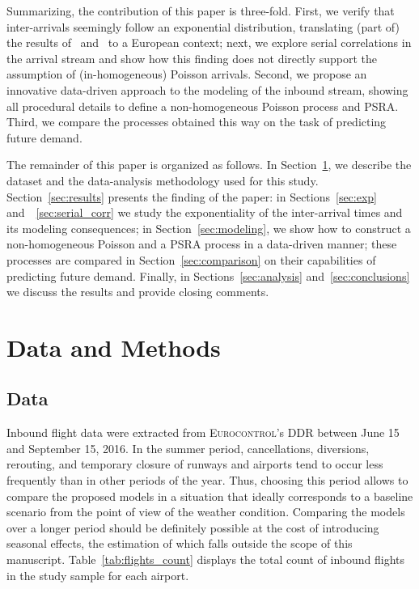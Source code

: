 \documentclass[draft,review]{elsarticle}
\begin{document}
Summarizing, the contribution of this paper is three-fold.
First, we verify that inter-arrivals seemingly follow an exponential distribution, translating (part of) the results of~\cite{willemain2004statistical} and~\citep{gwiggner2014data} to a European context; next, we explore serial correlations in the arrival stream and show how this finding does not directly support the assumption of (in-homogeneous) Poisson arrivals. Second, we propose an innovative data-driven approach to the modeling of the inbound stream, showing all procedural details to define a non-homogeneous Poisson process and \ac{PSRA}. Third, we compare the processes obtained this way on the task of predicting future demand.

The remainder of this paper is organized as follows.
In Section~\ref{sec:data_methods}, we describe the dataset and the data-analysis methodology used for this study.
Section~\ref{sec:results} presents the finding of the paper:
in Sections~\ref{sec:exp} and~~\ref{sec:serial_corr} we study the exponentiality of the inter-arrival times and its modeling consequences; in Section~\ref{sec:modeling}, we show how to construct a non-homogeneous Poisson and a \ac{PSRA} process in a data-driven manner; these processes are compared in Section~\ref{sec:comparison} on their capabilities of predicting future demand.
Finally, in Sections~\ref{sec:analysis} and~\ref{sec:conclusions} we discuss the results and provide closing comments.

\section{Data and Methods}\label{sec:data_methods}

\subsection{Data}\label{sec:dm_data}

Inbound flight data were extracted from \textsc{Eurocontrol}'s \ac{DDR} between June 15 and September 15, 2016.
In the summer period, cancellations, diversions, rerouting, and temporary closure of runways and airports tend to occur less frequently than in other periods of the year. Thus, choosing this period allows to compare the proposed models in a situation that ideally corresponds to a baseline scenario from the point of view of the weather condition.
Comparing the models over a longer period should be definitely possible at the cost of introducing seasonal effects, the estimation of which falls outside the scope of this manuscript.
Table~\ref{tab:flights_count} displays the total count of inbound flights in the study sample for each airport.
\end{document}
